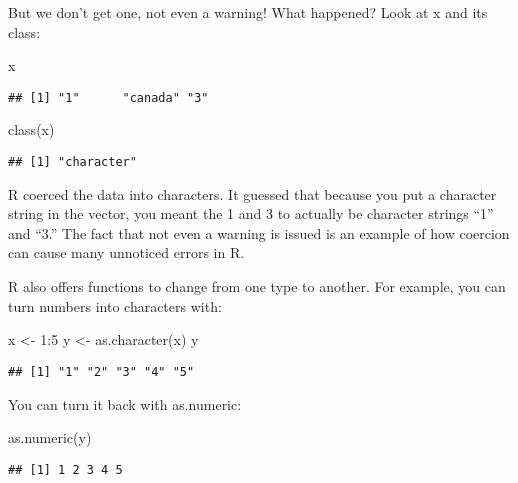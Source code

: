 \documentclass[
]{article}
\newenvironment{Shaded}{\begin{snugshade}}{\end{snugshade}}
\newcommand{\DecValTok}[1]{\textcolor[rgb]{0.00,0.00,0.81}{#1}}
\newcommand{\FunctionTok}[1]{\textcolor[rgb]{0.00,0.00,0.00}{#1}}
\newcommand{\NormalTok}[1]{#1}
\newcommand{\OtherTok}[1]{\textcolor[rgb]{0.56,0.35,0.01}{#1}}
\newcommand{\SpecialCharTok}[1]{\textcolor[rgb]{0.00,0.00,0.00}{#1}}
\begin{document}
But we don't get one, not even a warning! What happened? Look at x and
its class:

\begin{Shaded}
\begin{Highlighting}[]
\NormalTok{x}
\end{Highlighting}
\end{Shaded}

\begin{verbatim}
## [1] "1"      "canada" "3"
\end{verbatim}

\begin{Shaded}
\begin{Highlighting}[]
\FunctionTok{class}\NormalTok{(x)}
\end{Highlighting}
\end{Shaded}

\begin{verbatim}
## [1] "character"
\end{verbatim}

R coerced the data into characters. It guessed that because you put a
character string in the vector, you meant the 1 and 3 to actually be
character strings ``1'' and ``3.'' The fact that not even a warning is
issued is an example of how coercion can cause many unnoticed errors in
R.

R also offers functions to change from one type to another. For example,
you can turn numbers into characters with:

\begin{Shaded}
\begin{Highlighting}[]
\NormalTok{x }\OtherTok{\textless{}{-}} \DecValTok{1}\SpecialCharTok{:}\DecValTok{5}
\NormalTok{y }\OtherTok{\textless{}{-}} \FunctionTok{as.character}\NormalTok{(x)}
\NormalTok{y}
\end{Highlighting}
\end{Shaded}

\begin{verbatim}
## [1] "1" "2" "3" "4" "5"
\end{verbatim}

You can turn it back with as.numeric:

\begin{Shaded}
\begin{Highlighting}[]
\FunctionTok{as.numeric}\NormalTok{(y)}
\end{Highlighting}
\end{Shaded}

\begin{verbatim}
## [1] 1 2 3 4 5
\end{verbatim}
\end{document}
